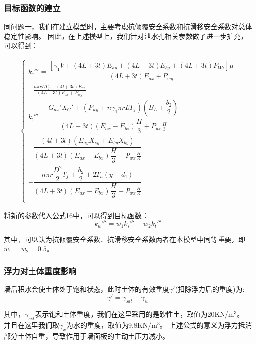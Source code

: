 \documentclass[withoutpreface,bwprint]{cumcmthesis}
\begin{document}
\subsubsection{目标函数的建立}
同问题一，我们在建立模型时，主要考虑抗倾覆安全系数和抗滑移安全系数对总体稳定性影响。
因此，在上述模型上，我们针对泄水孔相关参数做了进一步扩充，可以得到：

    \begin{equation}
        \begin{aligned}
            \begin{cases}
                k_s''' = \dfrac{[\gamma_1 V + (4L + 3t)E_{ay} + (4L + 3t)E_{by}+(4L + 3t)P_{Wy}]\mu }{(4L + 3t)E_{ax}+P_{wy}} \\
                    + \frac{n\pi r L T_f + (4l + 3t)E_{bx}}{(4L + 3t)E_{ax}+P_{wy}}\\
                k_t'''= \dfrac{G_{ax}' X_G' +(P_{wy}+ n\gamma_1 \pi r L T_f) \left(B_L + \dfrac{b_2}{2}\right) }{(4L + 3t)\left(E_{ax} - E_{bx}\right)\dfrac{H}{3}+P_{wx}\frac{H}{3}} \\
                    +\dfrac{ (4l + 3t)\left(E_{ay}X_{ay} + E_{by}X_{by}\right)}{(4L + 3t)\left(E_{ax} - E_{bx}\right)\dfrac{H}{3}+P_{wx}\frac{H}{3}}\\
                    + \dfrac{n\pi r \dfrac{D^2}{2}T_f + \dfrac{b_2}{2} + 2T_h(y + d_1)}{(4L + 3t)\left(E_{ax} - E_{bx}\right)\dfrac{H}{3}+P_{wx}\frac{H}{3}}\\
            \end{cases}
            \end{aligned}
        \label{eq:stability}
    \end{equation}

将新的参数代入公式16中，可以得到目标函数：
    \begin{equation}
        k_w'''=w_1k_s'''+w_2k_t'''
    \end{equation}
    \par
其中，可以认为抗倾覆安全系数、抗滑移安全系数两者在本模型中同等重要，即$w_1=w_2=0.5$。
\subsubsection{浮力对土体重度影响}
墙后积水会使土体处于饱和状态，此时土体的有效重度$\gamma'$(扣除浮力后的重度)为:
    \begin{equation}
        \gamma'=\gamma_{sat}-\gamma_{w}
    \end{equation}

其中，$\gamma_{sat}$表示饱和土体重度，我们在这里采用的是砂性土，取值为20KN/$\mathrm{m^3}$。
并且在这里我们取$\gamma_{w}$为水的重度，取值为9.8KN/$\mathrm{m^3}$。
上述公式的意义为浮力抵消部分土体自重，导致作用于墙面板的主动土压力减小。
\end{document}

